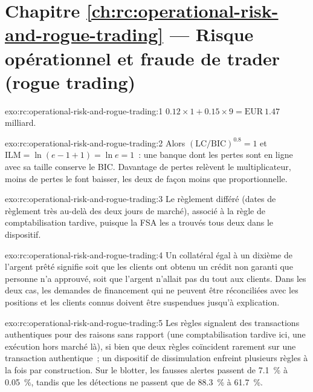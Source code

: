 \section*{Chapitre \ref{ch:rc:operational-risk-and-rogue-trading} --- Risque opérationnel et fraude de trader (rogue trading)}

\begin{solution}{exo:rc:operational-risk-and-rogue-trading:1}
$0.12\times1+0.15\times9 = \text{EUR}~1.47$ milliard.
\end{solution}

\begin{solution}{exo:rc:operational-risk-and-rogue-trading:2}
Alors $(\mathrm{LC}/\mathrm{BIC})^{0.8}=1$ et $\mathrm{ILM}=\ln(e-1+1)=\ln e=1$~: une banque dont les pertes sont en ligne avec sa
taille conserve le BIC. Davantage de pertes relèvent le multiplicateur, moins de pertes le font baisser, les deux de façon moins que proportionnelle.
\end{solution}

\begin{solution}{exo:rc:operational-risk-and-rogue-trading:3}
Le règlement différé (dates de règlement très au-delà des deux jours de marché), associé à la règle de comptabilisation tardive, puisque la FSA
les a trouvés tous deux dans le dispositif.
\end{solution}

\begin{solution}{exo:rc:operational-risk-and-rogue-trading:4}
Un collatéral égal à un dixième de l'argent prêté signifie soit que les clients ont obtenu un crédit non garanti que personne
n'a approuvé, soit que l'argent n'allait pas du tout aux clients. Dans les deux cas, les demandes de financement qui ne peuvent
être réconciliées avec les positions et les clients connus doivent être suspendues jusqu'à explication.
\end{solution}

\begin{solution}{exo:rc:operational-risk-and-rogue-trading:5}
Les règles signalent des transactions authentiques pour des raisons sans rapport (une comptabilisation tardive ici, une exécution hors marché là),
si bien que deux règles coïncident rarement sur une transaction authentique~; un dispositif de dissimulation enfreint plusieurs règles à la fois par construction.
Sur le blotter, les fausses alertes passent de 7.1~\% à 0.05~\%, tandis que les détections ne passent que de 88.3~\% à 61.7~\%.
\end{solution}

